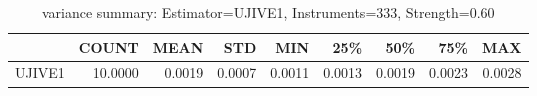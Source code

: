 \begin{table}[ht]
\centering
\caption{variance summary: Estimator=UJIVE1, Instruments=333, Strength=0.60}
\begin{tabular}{lrrrrrrrr}
\toprule
 & COUNT & MEAN & STD & MIN & 25\% & 50\% & 75\% & MAX \\
\midrule
UJIVE1 & 10.0000 & 0.0019 & 0.0007 & 0.0011 & 0.0013 & 0.0019 & 0.0023 & 0.0028 \\
\bottomrule
\end{tabular}
\end{table}
